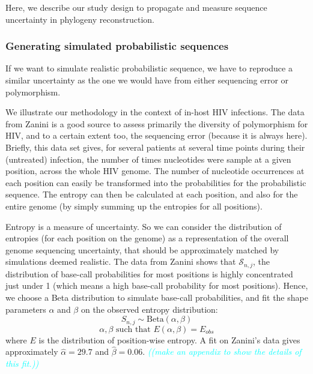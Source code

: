 \documentclass[10pt]{article}
\newcommand{\comment}[1]{\textsl{\textcolor{cyan}{((#1))}}}
\newcommand{\betadist}[1]{\mathrm{Beta}\left(#1\right)}
\newcommand{\nps}{\mathcal{S}} %
\begin{document}
Here, we describe our study design to propagate and measure sequence uncertainty in phylogeny reconstruction. 


\subsubsection{Generating simulated probabilistic sequences} 

If we want to simulate realistic probabilistic sequence, we have to reproduce a similar uncertainty as the one we would have from either sequencing error or polymorphism. 

We illustrate our methodology in the context of in-host HIV infections. 
The data from Zanini \cite{Zanini:2015} is a good source to assess primarily the diversity of polymorphism for HIV, and to a certain extent too, the sequencing error (because it is always here). 
Briefly, this data set gives, for several patients at several time points during their (untreated) infection, the number of times nucleotides were sample at a given position, across the whole HIV genome. 
The number of nucleotide occurrences at each position can easily be transformed into the probabilities for the probabilistic sequence. The entropy can then be calculated at each position, and also for the entire genome (by simply summing up the entropies for all positions). 

Entropy is a measure of uncertainty. So we can consider the distribution of entropies (for each position on the genome) as a representation of the overall genome sequencing uncertainty, that should be approximately matched by simulations deemed realistic. 
The data from Zanini shows that $\nps_{n,j}$, the distribution of base-call probabilities for most positions is highly concentrated just under 1 (which means a high base-call probability for most positions). 
Hence, we choose a Beta distribution to simulate base-call probabilities, and fit the shape parameters $\alpha$ and $\beta$ on the observed entropy distribution:
\begin{equation}
\label{eq:beta_sampling}
S_{n,j} \sim \betadist{\alpha, \beta}
\end{equation}
\begin{equation}
\alpha, \beta \text{ such that } E(\alpha,\beta) = E_{obs}
\end{equation}
where $E$ is the distribution of position-wise entropy.
A fit on Zanini's data \cite{Zanini:2015} gives approximately $\hat{\alpha} = 29.7$ and $\hat{\beta} = 0.06$. \comment{make an appendix to show the details of this fit.}
\end{document}
